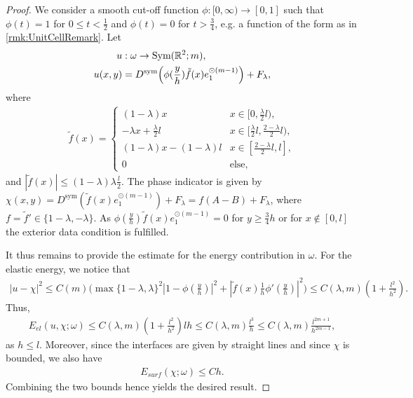 \documentclass[a4paper, 10pt, twoside, notitlepage]{amsart}
\theoremstyle{plain}
\newcommand{\R}{\mathbb{R}}
\newcommand{\Ds}{D^{\text{sym}}}
\begin{document}
		\begin{proof}
			We consider a smooth cut-off function $\phi: [0,\infty) \to [0,1]$ such that $\phi(t) = 1$ for $0 \leq t < \frac{1}{2}$ and $\phi(t) = 0$ for $t>\frac{3}{4}$, e.g. a function of the form as in
			\cref{rmk:UnitCellRemark}.  Let
			\begin{align*}
				u& : \omega \to \textup{Sym}(\R^2;m), \\
				u(x,y) & = \Ds \Big(\phi(\frac{y}{h}) \tilde{f}(x) e_1^{\odot (m-1)}\Big) + F_\lambda,
			\end{align*}
			where
			\begin{align*}
				\tilde{f}(x) = \begin{cases} (1-\lambda)x & x \in [0,\frac{\lambda}{2} l), \\ - \lambda x + \frac{\lambda}{2} l & x \in [\frac{\lambda}{2} l,\frac{2-\lambda}{2} l), \\ (1-\lambda)x - (1-\lambda) l & x \in [\frac{2-\lambda}{2} l,l], \\
					0 & \text{else}, \end{cases} 
			\end{align*} 
			and $ |\tilde{f}(x)| \leq (1-\lambda) \lambda \frac{l}{2}$.  The phase indicator is given by $\chi(x,y) = \Ds(\tilde{f}(x) e_1^{\odot (m-1)}) + F_\lambda = f (A-B) + F_\lambda$, where
			$f = \tilde{f}' \in \{1-\lambda,-\lambda\}$.  As $\phi(\frac{y}{h}) \tilde{f}(x) e_1^{\odot(m-1)} = 0$ for $ y \geq \frac{3}{4}h$ or for $x \notin [0,l]$ the exterior data condition is
			fulfilled.
			
			It thus remains to provide the estimate for the energy contribution in $\omega$.  For the elastic energy, we notice that
			\begin{align*}
				|u - \chi|^2 \leq C(m) \Big( \max\{1-\lambda,\lambda\}^2 |1-\phi(\frac{y}{h})|^2 + |\tilde{f}(x) \frac{1}{h} \phi'(\frac{y}{h})|^2 \Big) \leq C(\lambda,m)(1 + \frac{l^2}{h^{2}}).
			\end{align*}
			Thus,
			\begin{align*}
				E_{el}(u, \chi;\omega) \leq C(\lambda,m) (1+\frac{l^2}{h^{2}}) l h \leq C(\lambda,m) \frac{l^3}{h} \leq C(\lambda,m) \frac{l^{2m+1}}{h^{2m-1}},
			\end{align*}
			as $h \leq l$.  Moreover, since the interfaces are given by straight lines and since $\chi$ is bounded, we also have
			\begin{align*}
				E_{surf}(\chi;\omega) \leq C h.
			\end{align*}
			Combining the two bounds hence yields the desired result.
		\end{proof}
		
\end{document}
